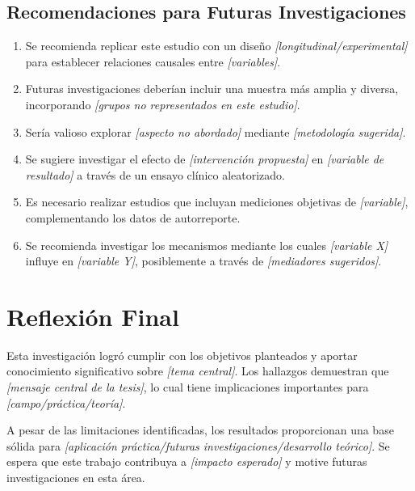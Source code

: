 \subsection{Recomendaciones para Futuras Investigaciones}
\label{subsec:recomendaciones_investigacion}

\begin{enumerate}
    \item Se recomienda replicar este estudio con un diseño \textit{[longitudinal/experimental]} para establecer relaciones causales entre \textit{[variables]}.
    
    \item Futuras investigaciones deberían incluir una muestra más amplia y diversa, incorporando \textit{[grupos no representados en este estudio]}.
    
    \item Sería valioso explorar \textit{[aspecto no abordado]} mediante \textit{[metodología sugerida]}.
    
    \item Se sugiere investigar el efecto de \textit{[intervención propuesta]} en \textit{[variable de resultado]} a través de un ensayo clínico aleatorizado.
    
    \item Es necesario realizar estudios que incluyan mediciones objetivas de \textit{[variable]}, complementando los datos de autorreporte.
    
    \item Se recomienda investigar los mecanismos mediante los cuales \textit{[variable X]} influye en \textit{[variable Y]}, posiblemente a través de \textit{[mediadores sugeridos]}.
\end{enumerate}

\section{Reflexión Final}
\label{sec:reflexion_final}

Esta investigación logró cumplir con los objetivos planteados y aportar conocimiento significativo sobre \textit{[tema central]}. Los hallazgos demuestran que \textit{[mensaje central de la tesis]}, lo cual tiene implicaciones importantes para \textit{[campo/práctica/teoría]}.

A pesar de las limitaciones identificadas, los resultados proporcionan una base sólida para \textit{[aplicación práctica/futuras investigaciones/desarrollo teórico]}. Se espera que este trabajo contribuya a \textit{[impacto esperado]} y motive futuras investigaciones en esta área.

